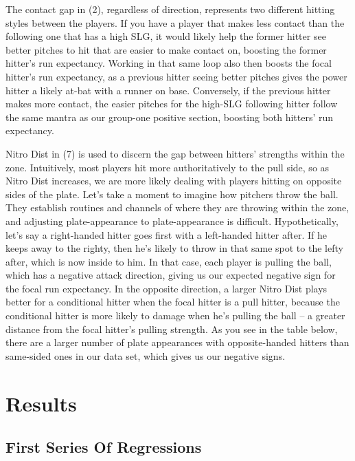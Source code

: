 \documentclass{article}
\newcommand{\tbl}[1]{}
\begin{document}
The contact gap in (2), regardless of direction, represents two different hitting styles between the players. If you have a player that makes less contact than the following one that has a high SLG, it would likely help the former hitter see better pitches to hit that are easier to make contact on, boosting the former hitter's run expectancy. Working in that same loop also then boosts the focal hitter's run expectancy, as a previous hitter seeing better pitches gives the power hitter a likely at-bat with a runner on base. Conversely, if the previous hitter makes more contact, the easier pitches for the high-SLG following hitter follow the same mantra as our group-one positive section, boosting both hitters' run expectancy.

Nitro Dist in (7) is used to discern the gap between hitters' strengths within the zone. Intuitively, most players hit more authoritatively to the pull side, so as Nitro Dist increases, we are more likely dealing with players hitting on opposite sides of the plate. Let's take a moment to imagine how pitchers throw the ball. They establish routines and channels of where they are throwing within the zone, and adjusting plate-appearance to plate-appearance is difficult. Hypothetically, let's say a right-handed hitter goes first with a left-handed hitter after. If he keeps away to the righty, then he's likely to throw in that same spot to the lefty after, which is now inside to him. In that case, each player is pulling the ball, which has a negative attack direction, giving us our expected negative sign for the focal run expectancy. In the opposite direction, a larger Nitro Dist plays better for a conditional hitter when the focal hitter is a pull hitter, because the conditional hitter is more likely to damage when he's pulling the ball -- a greater distance from the focal hitter's pulling strength. As you see in the table below, there are a larger number of plate appearances with opposite-handed hitters than same-sided ones in our data set, which gives us our negative signs.

\tbl{pair_side_composition}

\section{Results}

\subsection{First Series Of Regressions}
\end{document}
